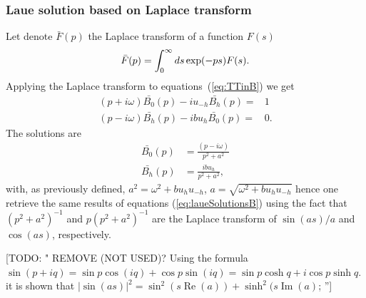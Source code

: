 \documentclass{iucr}
\newcommand{\todo}[1]{{\color{red}[TODO: "#1'']}}
\newcommand{\inred}[1]{{\color{red}#1}}
\begin{document}
\subsubsection{Laue solution based on Laplace transform}
\label{sec:laplaceLaue}
Let denote $\bar{F}(p)$ the Laplace transform of a function $F(s)$
\begin{equation}
\Bar{F}(p) = \int_0^\infty ds \exp(-p s) F(s).
\end{equation}
Applying the Laplace transform to equations~(\ref{eq:TTinB}) we get
\begin{subequations}
\label{eq:TTlaueLaplace}
\begin{align}
(p + i \omega) \bar{B_0}(p) - i u_{-h} \bar{B_h}(p)= & 1 \\
(p - i \omega) \bar{B_h}(p) - i b u_{h} \bar{B_0}(p)= & 0.
\end{align}
\end{subequations}
The solutions are
\begin{subequations}
\begin{align}
\bar{B_0}(p) &= \frac{(p - i \omega) }{p^2 + a^2} \\
\bar{B_h}(p) &= \frac{i b u_h}{p^2 + a^2},
\end{align}
\end{subequations}
with, \inred{as previously defined,} $a^2=\omega^2 + b u_h u_{-h}$, $a=\sqrt{\omega^2+b u_h u_{-h}}$
hence one retrieve the same results of equations (\ref{eq:laueSolutionsB}) using the fact that  $(p^2+a^2)^{-1}$ and $p(p^2+a^2)^{-1}$ are the Laplace transform of \inred{ $\sin(a s)/a$ and $\cos(a s)$}, respectively. 

\todo{ REMOVE (NOT USED)? Using the formula $\sin(p+i q)=\sin p \cos(i q) + \cos p \sin(i q)=\sin p \cosh q + i \cos p \sinh q$. it is shown that $|\sin(a s)|^2=\sin^2(s \operatorname{Re}(a)) + \sinh^2(s \operatorname{Im}(a)$;
}
\end{document}
